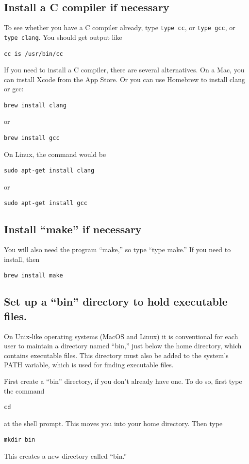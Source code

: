 \documentclass[11pt]{article}
\begin{document}
\subsection{Install a C compiler if necessary}
To see whether you have a C compiler already, type \texttt{type cc},
or \texttt{type gcc}, or \texttt{type clang}. You should get output like
\begin{verbatim}
cc is /usr/bin/cc
\end{verbatim}
If you need to install a C compiler, there are several
alternatives. On a Mac, you can install Xcode from the App Store. Or
you can use Homebrew to install clang or gcc:
\begin{verbatim}
brew install clang
\end{verbatim}
or
\begin{verbatim}
brew install gcc
\end{verbatim}
On Linux, the command would be
\begin{verbatim}
sudo apt-get install clang
\end{verbatim}
or
\begin{verbatim}
sudo apt-get install gcc
\end{verbatim}

\subsection{Install ``make'' if necessary}
You will also need the program ``make,'' so type ``type make.'' If you
need to install, then
\begin{verbatim}
brew install make
\end{verbatim}

\subsection{Set up a ``bin'' directory to hold executable files.}
On Unix-like operating systems (MacOS and Linux) it is conventional
for each user to maintain a directory named ``bin,'' just below the
home directory, which contains executable files. This directory must
also be added to the system's PATH variable, which is used for finding
executable files.

First create a ``bin'' directory, if you don't already have one. To do
so, first type the command
\begin{verbatim}
cd
\end{verbatim}
at the shell prompt. This moves you into your home directory. Then
type
\begin{verbatim}
mkdir bin
\end{verbatim}
This creates a new directory called ``bin.''
\end{document}
